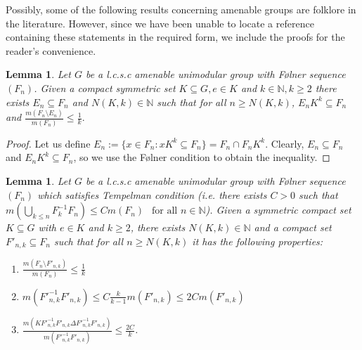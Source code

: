 \documentclass[11pt]{amsart}
\newtheorem{lem}[thm]{Lemma}
\theoremstyle{definition}
\theoremstyle{myremark}
\numberwithin{equation}{section}
\def\N{\mathbb N}
\begin{document}
Possibly, some of the following results concerning amenable groups are folklore in the literature. However, since we have been unable to locate a reference containing these statements in the required form, we include the proofs for the reader’s convenience.
\begin{lem}\label{F'_n_construction_1}
 Let $G$ be a l.c.s.c amenable unimodular group with F\o lner sequence $(F_n)$. Given a compact symmetric set $K \subseteq G, e\in K$ and $k\in \N, k\geq 2$  there exists $ E_n \subseteq F_n$ and $N(K,k) \in \N$ such that  for all $ n \geq N(K,k)$, $E_nK^k \subseteq F_n$ and $\frac{m(F_n\setminus E_n)}{m(F_n)} \leq \frac{1}{k}.$   
\end{lem}
\begin{proof}
    Let us define $E_n:= \{x\in F_n: xK^k \subseteq F_n\}=F_n \cap F_nK^{k}.$ Clearly, $E_n \subseteq F_n$ and $E_nK^k \subseteq F_n$, so we use the F\o lner condition to obtain the inequality.
\end{proof}
\begin{lem}\label{F'_n_construction_2}
Let $G$ be a l.c.s.c amenable unimodular group with F\o lner sequence $(F_n)$ which satisfies Tempelman condition   (i.e.  there exists $ C>0$ such that $m(\displaystyle\bigcup_{k\leq n} F_k^{-1}F_n) \leq Cm(F_n)~~\text{ for all } n \in \N$). Given a symmetric compact set $K \subseteq G$ with $e\in K$ and $k\geq 2$, there exists $ N(K,k) \in \N$ and a compact set $F'_{n,k} \subseteq F_n$ such that for all $ n \geq N(K,k)$ it has the following properties:\\
\begin{enumerate}
    \item $\frac{m(F_n \setminus F'_{n,k})}{m(F_n)} \leq \frac{1}{k}$
    \item $m({F'^{-1}_{n,k}}F'_{n,k}) \leq C\frac{k}{k-1}m(F'_{n,k}) \leq 2Cm(F'_{n,k})$
    \item $\frac{m(K{F'^{-1}_{n,k}}F'_{n,k} \Delta {F'^{-1}_{n,k}}F'_{n,k})}{m({F'^{-1}_{n,k}}F'_{n,k})} \leq \frac{2C}{k}$.
\end{enumerate}
\end{lem}
\end{document}
